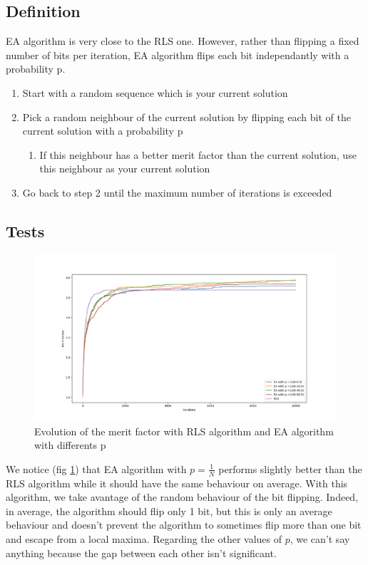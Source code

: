 \documentclass[a4paper,11pt,openany]{article}
\begin{document}
\subsection{Definition}
\noindent
EA algorithm \cite{ea} is very close to the RLS one. However, rather than flipping a fixed number of bits per iteration, EA algorithm flips each bit independantly with a probability p.
\begin{enumerate}
\item Start with a random sequence which is your current solution
\item Pick a random neighbour of the current solution by flipping each bit of the current solution with a probability p
\begin{enumerate}
\item If this neighbour has a better merit factor than the current solution, use this neighbour as your current solution
\end{enumerate}
\item Go back to step 2 until the maximum number of iterations is exceeded
\end{enumerate}
\subsection{Tests}
\begin{figure}[H]
\begin{center}
\includegraphics[scale=0.28]{Images/ea_different_p}
\caption{Evolution of the merit factor with RLS algorithm and EA algorithm with differents p}
\label{fig:ea_different_p}
\end{center}
\end{figure}
\noindent
We notice (fig \ref{fig:ea_different_p}) that EA algorithm with $p=\frac{1}{N}$ performs slightly better than the RLS algorithm while it should have the same behaviour on average. With this algorithm, we take avantage of the random behaviour of the bit flipping. Indeed, in average, the algorithm should flip only 1 bit, but this is only an average behaviour and doesn't prevent the algorithm to sometimes flip more than one bit and escape from a local maxima. Regarding the other values of $p$, we can't say anything because the gap between each other isn't significant.
\end{document}
